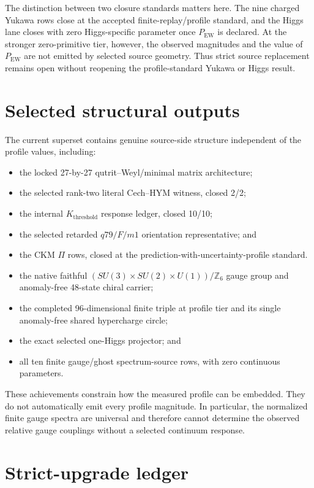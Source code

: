 \documentclass[11pt]{article}
\begin{document}
The distinction between two closure standards matters here. The nine charged
Yukawa rows close at the accepted finite-replay/profile standard, and the
Higgs lane closes with zero Higgs-specific parameter once
$P_{\mathrm{EW}}$ is declared. At the stronger zero-primitive tier, however,
the observed magnitudes and the value of $P_{\mathrm{EW}}$ are not emitted by
selected source geometry. Thus strict source replacement remains open without
reopening the profile-standard Yukawa or Higgs result.

\section{Selected structural outputs}

The current superset contains genuine source-side structure independent of the
profile values, including:
\begin{itemize}
\item the locked 27-by-27 qutrit--Weyl/minimal matrix architecture;
\item the selected rank-two literal Cech--HYM witness, closed 2/2;
\item the internal $K_{\mathrm{threshold}}$ response ledger, closed 10/10;
\item the selected retarded $q79/F/m1$ orientation representative; and
\item the CKM $\Pi$ rows, closed at the prediction-with-uncertainty-profile
standard.
\item the native faithful
$(SU(3)\times SU(2)\times U(1))/\mathbb Z_6$ gauge group and anomaly-free
48-state chiral carrier;
\item the completed 96-dimensional finite triple at profile tier and its
single anomaly-free shared hypercharge circle;
\item the exact selected one-Higgs projector; and
\item all ten finite gauge/ghost spectrum-source rows, with zero continuous
parameters.
\end{itemize}
These achievements constrain how the measured profile can be embedded. They do
not automatically emit every profile magnitude. In particular, the normalized
finite gauge spectra are universal and therefore cannot determine the observed
relative gauge couplings without a selected continuum response.

\section{Strict-upgrade ledger}
\end{document}
